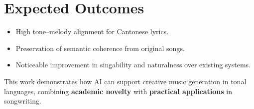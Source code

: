 \documentclass{article}
\begin{document}
\section{Expected Outcomes}
\begin{itemize}
    \item High tone--melody alignment for Cantonese lyrics.
    \item Preservation of semantic coherence from original songs.
    \item Noticeable improvement in singability and naturalness over existing systems.
\end{itemize}

This work demonstrates how AI can support creative music generation in tonal languages, combining \textbf{academic novelty} with \textbf{practical applications} in songwriting.
\end{document}
